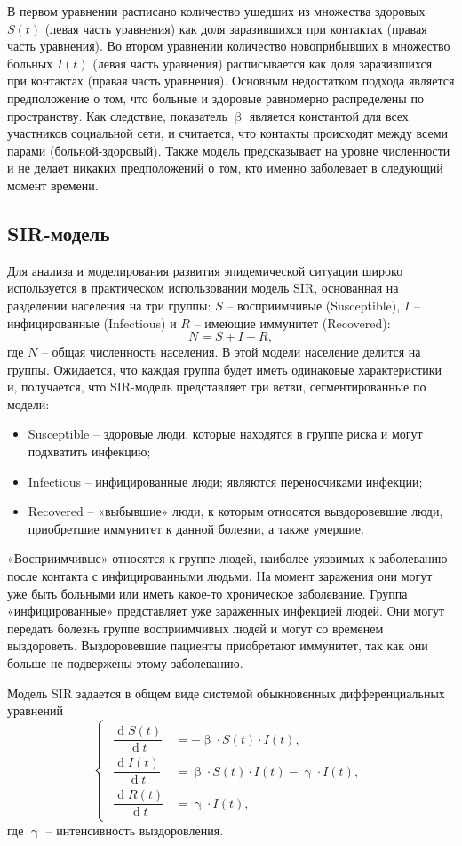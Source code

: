 \documentclass[a4paper, 12pt]{extarticle}
\numberwithin{equation}{section}
\renewcommand{\beta}{\upbeta}
\renewcommand{\gamma}{\upgamma}
\renewcommand{\d}{\operatorname{d}}
\begin{document}
	В первом уравнении расписано количество ушедших из множества здоровых $S(t)$ (левая часть уравнения) как доля заразившихся при контактах (правая часть уравнения). Во втором уравнении количество новоприбывших в множество больных $I(t)$ (левая часть уравнения) расписывается как доля заразившихся при контактах (правая часть уравнения). Основным недостатком подхода является предположение о том, что больные и здоровые равномерно распределены по пространству. Как следствие, показатель $\beta$ является константой для всех участников социальной сети, и считается, что контакты происходят между всеми парами (больной-здоровый). Также модель предсказывает на уровне численности и не делает никаких предположений о том, кто именно заболевает в следующий момент времени.
	
	
	\subsection{SIR-модель}
	Для анализа и моделирования развития эпидемической ситуации широко используется в практическом использовании модель SIR, основанная на разделении населения на три группы: $S$ -- восприимчивые (Susceptible), $I$ -- инфицированные (Infectious) и $R$ -- имеющие иммунитет (Recovered): $$N = S + I + R,$$ где $N$ -- общая численность населения.
	В этой модели население делится на группы. Ожидается, что каждая группа будет иметь одинаковые характеристики и, получается, что SIR-модель представляет три ветви, сегментированные по модели:
	\begin{itemize}
		\item Susceptible – здоровые люди, которые находятся в группе риска и могут подхватить инфекцию;
		\item Infectious – инфицированные люди; являются переносчиками инфекции;
		\item Recovered – «выбывшие» люди, к которым относятся выздоровевшие люди, приобретшие иммунитет к данной болезни, а также умершие.
	\end{itemize}
	«Восприимчивые» относятся к группе людей, наиболее уязвимых к заболеванию после контакта с инфицированными людьми. На момент заражения они могут уже быть больными или иметь какое-то хроническое заболевание. Группа «инфицированные» представляет уже зараженных инфекцией людей. Они могут передать болезнь группе восприимчивых людей и могут со временем выздороветь. Выздоровевшие пациенты приобретают иммунитет, так как они больше не подвержены этому заболеванию.
	
	Модель SIR задается в общем виде системой обыкновенных дифференциальных уравнений 
	\begin{equation}
		\left\{ 
		\begin{gathered} 
			\begin{aligned}
				\dfrac {\d S(t)}{\d t} &= -\beta \cdot S(t) \cdot I(t),\\
				\dfrac{\d I(t)}{\d t} &= \beta \cdot S(t)\cdot I(t) - \gamma\cdot I(t),\\
				\dfrac{\d R(t)}{\d t} &= \gamma\cdot I(t), 
			\end{aligned}
		\end{gathered} 
		\right.
	\end{equation}
	где $\gamma$ -- интенсивность выздоровления.
	
\end{document}
